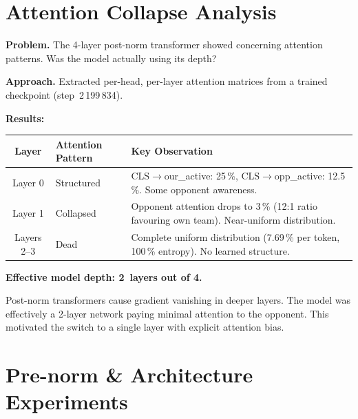 
\section{Attention Collapse Analysis}

\textbf{Problem.} The 4-layer post-norm transformer showed concerning
attention patterns.  Was the model actually using its depth?

\textbf{Approach.} Extracted per-head, per-layer attention matrices from a
trained checkpoint (step~2\,199\,834).

\textbf{Results:}

\begin{center}
\small
\begin{tabularx}{\textwidth}{c l X}
  \toprule
  \textbf{Layer} & \textbf{Attention Pattern} & \textbf{Key Observation} \\
  \midrule
  Layer 0 & Structured &
    CLS$\to$our\_active: 25\,\%, CLS$\to$opp\_active: 12.5\,\%.
    Some opponent awareness. \\
  Layer 1 & Collapsed &
    Opponent attention drops to 3\,\% (12:1 ratio favouring own team).
    Near-uniform distribution. \\
  Layers 2--3 & Dead &
    Complete uniform distribution (7.69\,\% per token, 100\,\% entropy).
    No learned structure. \\
  \bottomrule
\end{tabularx}
\end{center}

\textbf{Effective model depth: 2~layers out of 4.}

\begin{keyinsight}
Post-norm transformers cause gradient vanishing in deeper layers.  The model
was effectively a 2-layer network paying minimal attention to the opponent.
This motivated the switch to a single layer with explicit attention bias.
\end{keyinsight}


\section{Pre-norm \& Architecture Experiments}

